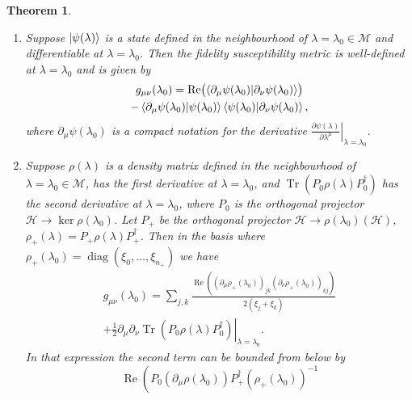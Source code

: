 \documentclass[
  american,aps,pra,reprint,floatfix,nofootinbib,superscriptaddress
]{revtex4-2}
\DeclareMathOperator{\Tr}{Tr}
\DeclareMathOperator{\real}{Re}
\DeclareMathOperator{\diag}{diag}
\newtheorem{theorem}{Theorem}
\begin{document}
\begin{theorem}
  \label{th:def.g}
  \begin{enumerate}
    \item Suppose $\ket{\psi(\lambda)}$ is a state defined in the
      neighbourhood of
      $\lambda = \lambda_0 \in \mathcal{M}$ and differentiable at
      $\lambda=\lambda_0$.  Then the fidelity susceptibility metric
      is well-defined at
      $\lambda=\lambda_0$ and is given by
      \begin{multline}
        \label{eq:gmunu.pure}
        g_{\mu\nu}(\lambda_0) = \real\bigl(\braket{\partial_\mu \psi(\lambda_0)
          | \partial_\nu \psi(\lambda_0)}\bigr)\\
        - \braket{\partial_\mu \psi(\lambda_0) | \psi(\lambda_0)}
          \braket{\psi(\lambda_0) | \partial_\nu \psi(\lambda_0)},
      \end{multline}
      where $\partial_\mu \psi(\lambda_0)$ is a compact notation for the derivative
      $\left.\frac{\partial \psi(\lambda)}{\partial \lambda^\mu}
      \right|_{\lambda=\lambda_0}$.
    \item Suppose $\rho(\lambda)$ is a density matrix defined in the
      neighbourhood of $\lambda = \lambda_0 \in \mathcal{M}$, has the first
      derivative at $\lambda = \lambda_0$, and $\Tr(P_0 \rho(\lambda) P_0^{\dagger})$
      has the second derivative
      at $\lambda = \lambda_0$, where $P_0$ is the orthogonal
      projector $\mathcal{H} \to \ker\rho(\lambda_0)$.
      Let $P_{{+}}$ be the orthogonal projector
      $\mathcal{H} \to \rho(\lambda_0)(\mathcal{H})$,
      $\rho_{+}(\lambda) = P_{{+}} \rho(\lambda) P_{{+}}^{\dagger}$.
      Then in the basis where
      $\rho_{+}(\lambda_0) = \diag(\xi_0,\dots,\xi_{n_{+}})$
      we have
      \begin{multline}
        g_{\mu\nu}(\lambda_0)
        = \sum_{j,k} \frac{
            \real\left(
              (\partial_\mu\rho_{+}(\lambda_0))_{jk}
              (\partial_\nu\rho_{+}(\lambda_0))_{kj}
            \right)
          }{2(\xi_j + \xi_k)}\\
        + \frac12 \left.\partial_\mu \partial_\nu \Tr(P_0 \rho(\lambda) P_0^{\dagger})
          \right|_{\lambda=\lambda_0}.
      \end{multline}
      In that expression the second term can be bounded from below by
      \begin{equation}
        \label{eq:g2bound}
        \real\left(
          P_0 \left(\partial_\mu\rho(\lambda_0)\right)
          P_{+}^{\dagger} \left(\rho_{+}(\lambda_0)\right)^{-1}

\end{equation}
\end{enumerate}
\end{theorem}
\end{document}

